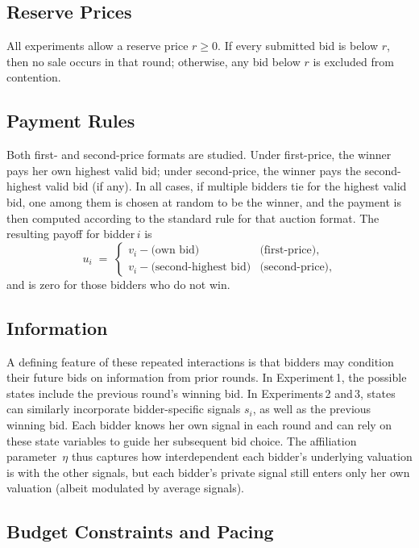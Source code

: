 \subsection{Reserve Prices}

All experiments allow a reserve price $r\ge 0$. If every submitted bid is below $r$, then no sale occurs in that round; otherwise, any bid below $r$ is excluded from contention.

\subsection{Payment Rules}

Both first- and second-price formats are studied. Under first-price, the winner pays her own highest valid bid; under second-price, the winner pays the second-highest valid bid (if any). In all cases, if multiple bidders tie for the highest valid bid, one among them is chosen at random to be the winner, and the payment is then computed according to the standard rule for that auction format. The resulting payoff for bidder\,$i$ is
\[
u_{i} \;=\;
\begin{cases}
v_{i} - \text{(own bid)} & \text{(first-price),}\\
v_{i} - \text{(second-highest bid)} & \text{(second-price),}
\end{cases}
\]
and is zero for those bidders who do not win.

\subsection{Information}

A defining feature of these repeated interactions is that bidders may condition their future bids on information from prior rounds. In Experiment\,1, the possible states include the previous round's winning bid. In Experiments\,2 and\,3, states can similarly incorporate bidder-specific signals $s_{i}$, as well as the previous winning bid. Each bidder knows her own signal in each round and can rely on these state variables to guide her subsequent bid choice. The affiliation parameter~$\eta$ thus captures how interdependent each bidder's underlying valuation is with the other signals, but each bidder's private signal still enters only her own valuation (albeit modulated by average signals).

\subsection{Budget Constraints and Pacing}

